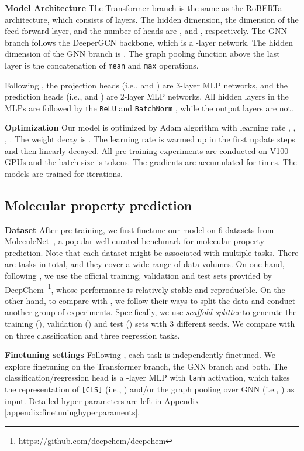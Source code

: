 \documentclass{article}
\begin{document}
\noindent\textbf{Model Architecture}
The Transformer branch is the same as the RoBERTa architecture, which consists of   layers. The hidden dimension, the dimension of the feed-forward layer, and the number of heads are ,  and , respectively. The GNN branch follows the DeeperGCN \citep{li2020deepergcn} backbone, which is a -layer network. The hidden dimension of the GNN branch is . The graph pooling function above the last layer is the concatenation of \texttt{mean} and \texttt{max} operations. 

Following \cite{chen2020simple, BYOL2020}, the projection heads (i.e.,  and ) are 3-layer MLP networks, and the prediction heads (i.e.,  and ) are 2-layer MLP networks. All hidden layers in the MLPs are followed by the \texttt{ReLU} and \texttt{BatchNorm} \citep{ioffe2015batch}, while the output layers are not. 


\noindent\textbf{Optimization}
Our model is optimized by Adam \citep{kingma2014adam} algorithm with learning rate , , , . The weight decay is . The learning rate is warmed up in the first  update steps and then linearly decayed. All pre-training experiments are conducted on V100 GPUs and the batch size is  tokens. The  gradients are accumulated for  times. The models are trained for  iterations. 

\subsection{Molecular property prediction}
\noindent\textbf{Dataset} 
After pre-training, we first finetune our model on 6 datasets from MoleculeNet~\cite{wu2018moleculenet}, a popular well-curated benchmark for molecular property prediction. Note that each dataset might be associated with multiple tasks. There are  tasks in total, and they cover a wide range of data volumes. On one hand, following \cite{wang2021molclr}, we use the official training, validation and test sets provided by DeepChem~\footnote{\url{https://github.com/deepchem/deepchem}}, whose performance is relatively stable and reproducible.
On the other hand, to compare with  \citep{rong2020self,li2020learn}, we follow their ways to split the data and conduct another group of experiments. Specifically, we use {\it scaffold splitter} to generate the training (), validation () and test () sets with 3 different seeds. We compare with \citep{rong2020self,li2020learn} on three classification and three regression tasks. 


\noindent\textbf{Finetuning settings} Following \cite{liu2019ngram,wang2021molclr}, each task is independently finetuned. We explore finetuning on the Transformer branch, the GNN branch and both. The classification/regression head is a -layer MLP with \texttt{tanh} activation, which takes the representation of \texttt{[CLS]} (i.e., ) and/or the graph pooling over GNN (i.e., ) as input. Detailed hyper-parameters are left in Appendix \ref{appendix:finetuninghyperparaments}.
\end{document}
